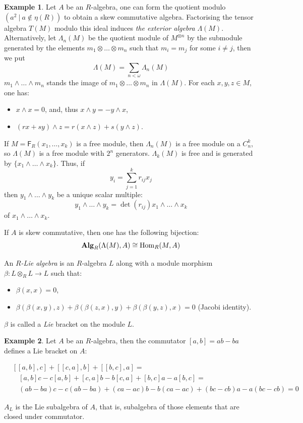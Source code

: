 \documentclass[8pt]{article}
\theoremstyle{definition}
\theoremstyle{definition}
\theoremstyle{definition}
\theoremstyle{definition}
\theoremstyle{definition}
\theoremstyle{definition}
\theoremstyle{definition}
\theoremstyle{definition}
\theoremstyle{definition}
\theoremstyle{definition}
\theoremstyle{definition}
\theoremstyle{definition}
\newtheorem{example}{Example}[section]
\theoremstyle{definition}
\theoremstyle{definition}
\theoremstyle{question}
\begin{document}
\begin{example}
  Let $A$ be an $R$-algebra, one can form the quotient modulo $(a^2 \: | \: a \notin \eta(R))$
  to obtain a skew commutative algebra. Factorising the tensor algebra $T(M)$ modulo this ideal
  induces \emph{the exterior algebra} $\Lambda(M)$. Alternatively,
  let $\Lambda_n(M)$ be the quotient module of $M^{\otimes n}$ by the submodule generated by
  the elements $m_1 \otimes \ldots \otimes m_n$ such that $m_i = m_j$ for some $i \neq j$, then we put
  \[
  \Lambda(M) = \sum \limits_{n < \omega} \Lambda_n(M)
  \]
  $m_1 \land \ldots \land m_n$ stands the image of $m_1 \otimes \ldots \otimes m_n$ in $\Lambda(M)$.
  For each $x, y, z \in M$, one has:
  \begin{itemize}
    \item $x \land x = 0$, and, thus $x \land y = - y \land x$,
    \item $(r x + s y) \land z = r(x \land z) + s (y \land z)$.
  \end{itemize}

  If $M = \mathsf{F}_R(x_1, \ldots, x_k)$ is a free module, then $\Lambda_n(M)$ is a free module
  on a $C^k_n$, so $\Lambda(M)$ is a free module with $2^n$ generators. $\Lambda_k(M)$ is free and is 
  generated by $\{ x_1 \land \ldots \land x_k \}$. Thus, if
  \[
  y_i = \sum \limits_{j = 1}^k r_{ij}x_j
  \]
  then $y_1 \land \ldots \land y_k$ be a unique scalar multiple:
  \[
  y_1 \land \ldots \land y_k = \operatorname{det}(r_{ij}) x_1 \land \ldots \land x_k
  \]
  of $x_1 \land \ldots \land x_k$.

  If $A$ is skew commutative, then one has the following bijection:
  \[
  {\bf Alg}_R(\Lambda(M), A) \cong \operatorname{Hom}_R(M, A)
  \]
\end{example}

An \emph{$R$-Lie algebra} is an $R$-algebra $L$ along with a module morphism 
$\beta : L \otimes_R L \to L$ such that:
\begin{itemize}
  \item $\beta(x, x) = 0$,
  \item$\beta(\beta(x, y), z) + \beta(\beta(z, x), y) + \beta(\beta(y, z), x) = 0$ (Jacobi identity).
\end{itemize}

$\beta$ is called a \emph{Lie} bracket on the module $L$.

\begin{example}
  Let $A$ be an $R$-algebra, then the commutator $[ a, b ] = a b - b a$ defines a Lie bracket on $A$:

\[
\begin{array}{lll}
  &  [[a, b], c] + [[c, a], b] + [[b, c], a] = & \\
  & \:\:\:\: [a, b] c - c [a, b] + [c,a]b - b [c, a] + [b, c] a - a[b, c] = & \\
  & \:\:\:\: (a b - b a) c - c (a b - b a) + (c a - a c) b - b (c a - a c) + (b c - c b) a - a(b c - c b) = 0 &
\end{array}
\]

  $A_L$ is the Lie subalgebra of $A$, that is, subalgebra of those elements that are closed under
  commutator.
\end{example}
\end{document}
